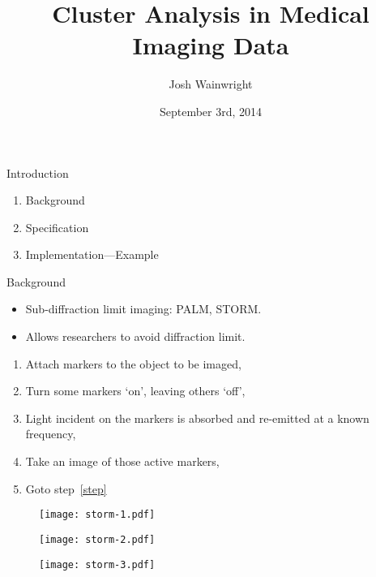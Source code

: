 \documentclass{beamer}
\title{Cluster Analysis in Medical Imaging Data}
\author{Josh Wainwright}
\institute{Supervisor: Iain Styles}
\date{September 3rd, 2014}
\begin{document}
\graphicspath{ {images/} }

\begin{frame}
\titlepage%
\end{frame}

\begin{frame}{Introduction}
	\begin{enumerate}
		\item Background
		\item Specification
		\item Implementation---Example
	\end{enumerate}
\end{frame}

\begin{frame}{Background}
	\begin{itemize}
		\item Sub-diffraction limit imaging: PALM, STORM\@.
		\item Allows researchers to avoid diffraction limit.
	\end{itemize}
	\begin{enumerate}
		\item Attach markers to the object to be imaged,
		\item\label{step} Turn some markers `on', leaving others `off',
		\item Light incident on the markers is absorbed and re-emitted at a
			known frequency,
		\item Take an image of those active markers,
		\item Goto step~\ref{step}
	\end{enumerate}
\end{frame}

\begin{frame}
	\begin{figure}
		\texttt{[image: storm-1.pdf]}
	\end{figure}
\end{frame}

\begin{frame}
	\begin{figure}
		\texttt{[image: storm-2.pdf]}
	\end{figure}
\end{frame}

\begin{frame}
	\begin{figure}
		\texttt{[image: storm-3.pdf]}
	\end{figure}
\end{frame}
\end{document}
